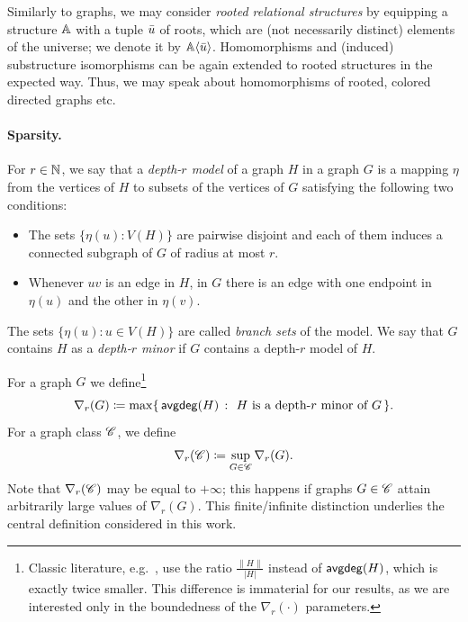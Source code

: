 Similarly to graphs, we may consider \emph{rooted relational structures} by equipping a structure $\mathbb{A}$ with a tuple ${\bar{u}}$ of roots, which are (not necessarily distinct) elements of the universe; we denote it by $\mathbb{A}\langle {\bar{u}}\rangle$. Homomorphisms and (induced) substructure isomorphisms can be again extended to rooted structures in the expected way. Thus, we may speak about homomorphisms of rooted, colored directed graphs etc.

\paragraph*{Sparsity.} For $r\in \mathbb{N}$, we say that a \emph{depth-$r$ model} of a graph $H$ in a graph $G$ is a mapping $\eta$ from the vertices of $H$ to subsets of the vertices of $G$ satisfying the following two conditions:
\begin{itemize}
	\item The sets $\{\eta(u)\colon V(H)\}$ are pairwise disjoint and each of them induces a connected subgraph of $G$ of radius at most $r$.
	\item Whenever $uv$ is an edge in $H$, in $G$ there is an edge with one endpoint in $\eta(u)$ and the other in $\eta(v)$.
\end{itemize}
The sets $\{\eta(u)\colon u\in V(H)\}$ are called \emph{branch sets} of the model. We say that $G$ contains $H$ as a \emph{depth-$r$ minor} if $G$ contains a depth-$r$ model of $H$.

For a graph $G$ we define\footnote{Classic literature, e.g.~\cite{sparsity}, use the ratio $\frac{\|H\|}{|H|}$ instead of $\mathsf{avgdeg}(H)$, which is exactly twice smaller. This difference is immaterial for our results, as we are interested only in the boundedness of the $\nabla_r(\cdot)$ parameters.}
\[\nabla_r(G)\coloneqq \max\{\,\mathsf{avgdeg}(H)~\colon~H\textrm{ is a depth-}r\textrm{ minor of }G\,\}.\]
For a graph class $\mathscr C$, we define
\[\nabla_r(\mathscr C)\coloneqq \sup_{G\in \mathscr C} \nabla_r(G).\]
Note that $\nabla_r(\mathscr C)$ may be equal to $+\infty$; this happens if graphs $G\in \mathscr C$ attain arbitrarily large values of $\nabla_r(G)$. This finite/infinite distinction underlies the central definition considered in this work.


